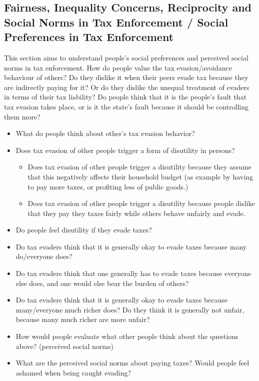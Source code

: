 \documentclass[a4paper, 12pt]{article}
\begin{document}
\subsection{Fairness, Inequality Concerns, Reciprocity and Social Norms in Tax Enforcement / Social Preferences in Tax Enforcement} 
This section aims to understand people's social preferences and perceived social norms in tax enforcement. How do people value the tax evasion/avoidance behaviour of others? Do they dislike it when their peers evade tax because they are indirectly paying for it? Or do they dislike the unequal treatment of evaders in terms of their tax liability? Do people think that it is the people's fault that tax evasion takes place, or is it the state's fault because it should be controlling them more? 

\begin{itemize}
    \item What do people think about other's tax evasion behavior? 
    \item Does tax evasion of other people trigger a form of disutility in persons?
    \begin{itemize}
        \item Does tax evasion of other people trigger a disutility because they assume that this negatively affects their household budget (as example by having to pay more taxes, or profiting less of public goods.)
        \item Does tax evasion of other people trigger a disutility because people dislike that they pay they taxes fairly while others behave unfairly and evade. 
    \end{itemize}
    \item Do people feel disutility if they evade taxes? 
    \item Do tax evaders think that it is generally okay to evade taxes because many do/everyone does?  
    \item Do tax evaders think that one generally has to evade taxes because everyone else does, and one would else bear the burden of others?
    \item Do tax evaders think that it is generally okay to evade taxes because many/everyone much richer does?  Do they think it is generally not unfair, because many much richer are more unfair?
    \item How would people evaluate what other people think about the questions above? (perceived social norms)
    \item What are the perceived social norms about paying taxes? Would people feel ashamed when being caught evading? 
\end{itemize}
\end{document}
